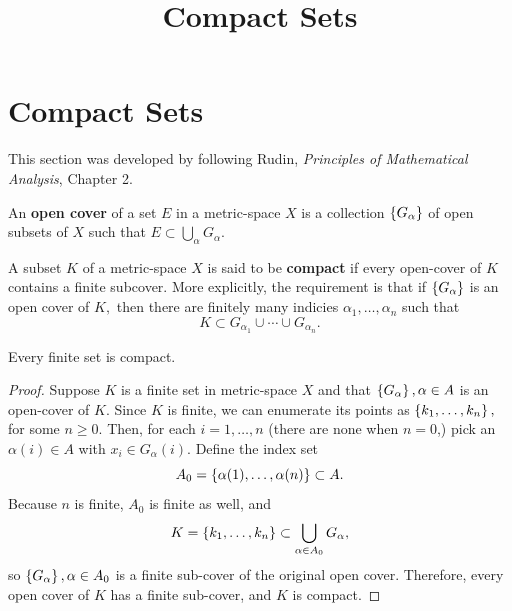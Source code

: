 \documentclass{article}
\title{Compact Sets}
\begin{document}
\section{Compact Sets}

\begin{note}\label{compact-sets-reference-note}
This section was developed by following Rudin, \emph{Principles of Mathematical Analysis}, Chapter 2.
\end{note}

\begin{definition}
An \textbf{open cover} of a set $E$ in a \@{metric-space} $X$ is a \@{collection} $\left\{ G_\alpha \right\}$ of \@{open} subsets of $X$ such that $E \subset \bigcup_\alpha G_\alpha.$
\end{definition}

\begin{definition}[Compact]\label{compact}
A subset $K$ of a \@{metric-space} $X$ is said to be \textbf{compact} if every \@{open-cover} of $K$ contains a finite subcover. More explicitly, the requirement is that if $\left\{ G_\alpha \right\}$ is an open cover of $K,$ then there are finitely many indicies $\alpha_1, \dots, \alpha_n$ such that
\[ K \subset G_{\alpha_1} \cup \cdots \cup G_{\alpha_n}. \]
\end{definition}

\begin{theorem}\label{finite-sets-are-compact}
Every \@{finite} set is \@{compact}.
\end{theorem}
\begin{proof}
Suppose $K$ is a \@{finite} set in \@{metric-space} $X$ and that $\left\{ G_\alpha \right\}, \alpha \in A$ is an \@{open-cover} of $K.$ Since $K$ is finite, we can enumerate its points as $\left\{ k_1, \dots, k_n \right\},$ for some $n \geq 0.$ Then, for each $i = 1, \dots, n$ (there are none when $n = 0$,) pick an $\alpha(i) \in A$ with $x_i \in G_\alpha(i).$ Define the index set
\[ A_0 = \left\{ \alpha(1), \dots, \alpha(n) \right\} \subset A. \]
Because $n$ is finite, $A_0$ is finite as well, and
\[ K = \left\{ k_1, \dots, k_n \right\} \subset \bigcup_{\alpha \in A_0} G_\alpha, \]
so $\left\{ G_\alpha \right\}, \alpha \in A_0$ is a finite sub-cover of the original open cover. Therefore, every open cover of $K$ has a finite sub-cover, and $K$ is \@{compact}.
\end{proof}
\end{document}
